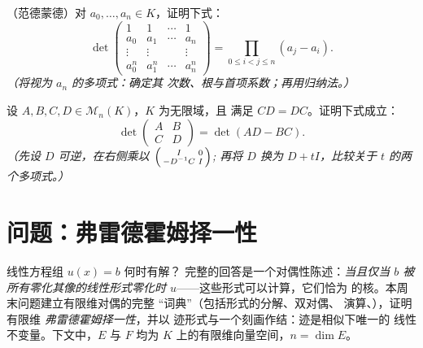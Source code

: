 \begin{exercise}[$\star\star$]\label{exo:b2:linalg:11}
（范德蒙德）对 $a_0, \dots, a_n \in K$，证明下式：
\[
\det\begin{pmatrix}
1 & 1 & \cdots & 1\\
a_0 & a_1 & \cdots & a_n\\
\vdots & \vdots & & \vdots\\
a_0^n & a_1^n & \cdots & a_n^n
\end{pmatrix}
= \prod_{0 \leq i < j \leq n} (a_j - a_i).
\]
\emph{（将视为 $a_n$ 的多项式：确定其
次数、根与首项系数；再用归纳法。）}
\end{exercise}

\begin{exercise}[$\star\star\star$]\label{exo:b2:linalg:12}
设 $A, B, C, D \in \mathcal{M}_n(K)$，$K$ 为无限域，且
满足 $CD = DC$。证明下式成立：
\[
\det\begin{pmatrix} A & B\\ C & D\end{pmatrix}
= \det(AD - BC).
\]
\emph{（先设 $D$ 可逆，在右侧乘以
$\begin{psmallmatrix} I & 0\\ -D^{-1}C & I\end{psmallmatrix}$;
再将 $D$ 换为 $D + tI$，比较关于 $t$ 的两个多项式。）}
\end{exercise}

\section{问题：弗雷德霍姆择一性}

线性方程组 $u(x) = b$ 何时有解？
完整的回答是一个对偶性陈述：\emph{当且仅当 $b$ 被
所有零化其像的线性形式零化时
$u$}——这些形式可以计算，它们恰为
的核。本周末问题建立有限维对偶的完整
“词典”（包括形式的分解、双对偶、
演算、），证明有限维
\emph{弗雷德霍姆择一性}，并以
迹形式与一个刻画作结：迹是相似下唯一的
线性不变量。下文中，$E$ 与 $F$ 均为
$K$ 上的有限维向量空间，$n = \dim E$。

